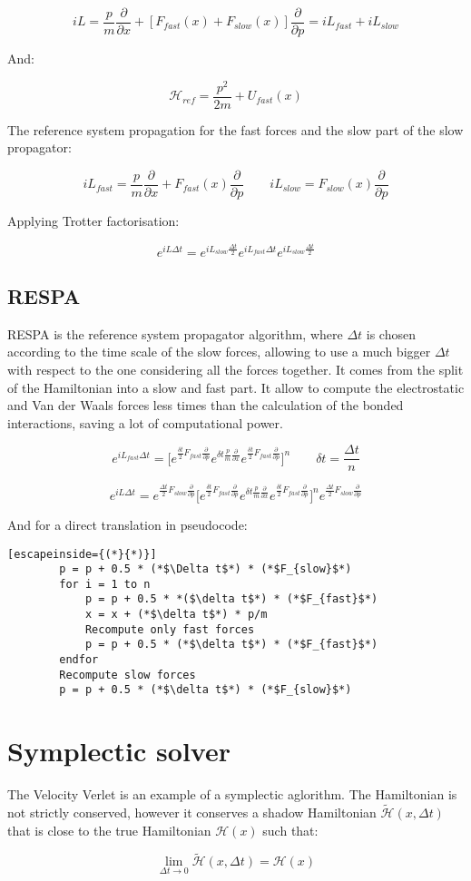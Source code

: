 	$$iL = \frac{p}{m}\frac{\partial }{\partial x} + [F_{fast}(x) + F_{slow}(x)]\frac{\partial}{\partial p} = iL_{fast} + iL_{slow}$$

	And:

	$$\mathcal{H}_{ref} = \frac{p^2}{2m} + U_{fast}(x)$$

	The reference system propagation for the fast forces and the slow part of the slow propagator:

	$$iL_{fast} = \frac{p}{m}\frac{\partial}{\partial x} + F_{fast}(x)\frac{\partial}{\partial p}\qquad iL_{slow} = F_{slow}(x)\frac{\partial}{\partial p}$$

	Applying Trotter factorisation:

	$$e^{iL\Delta t} = e^{iL_{slow}\frac{\Delta t}{2}}e^{iL_{fast}\Delta t}e^{iL_{slow}\frac{\Delta t}{2}}$$

	\subsection{RESPA}
	RESPA is the reference system propagator algorithm, where $\Delta t$ is chosen according to the time scale of the slow forces, allowing to use a much bigger $\Delta t$ with respect to the one considering all the forces together.
	It comes from the split of the Hamiltonian into a slow and fast part.
	It allow to compute the electrostatic and Van der Waals forces less times than the calculation of the bonded interactions, saving a lot of computational power.

	$$e^{iL_{fast}\Delta t} = \biggl[e^{\frac{\delta t}{2}F_{fast}\frac{\partial}{\partial p}}e^{\delta t\frac{p}{m}\frac{\partial}{\partial x}}e^{\frac{\delta t}{2}F_{fast}\frac{\partial}{\partial p}}\biggr]^n\qquad \delta t = \frac{\Delta t}{n}$$

	$$e^{iL\Delta t} = e^{\frac{\Delta t}{2}F_{slow}\frac{\partial}{\partial p}}\biggl[e^{\frac{\delta t}{2}F_{fast}\frac{\partial}{\partial p}}e^{\delta t\frac{p}{m}\frac{\partial}{\partial x}}e^{\frac{\delta t}{2}F_{fast}\frac{\partial}{\partial p}}\biggr]^ne^{\frac{\Delta t}{2}F_{slow}\frac{\partial}{\partial p}}$$

	And for a direct translation in pseudocode:

	\begin{lstlisting}[escapeinside={(*}{*)}]
		p = p + 0.5 * (*$\Delta t$*) * (*$F_{slow}$*)
		for i = 1 to n
			p = p + 0.5 * *($\delta t$*) * (*$F_{fast}$*)
			x = x + (*$\delta t$*) * p/m
			Recompute only fast forces
			p = p + 0.5 * (*$\delta t$*) * (*$F_{fast}$*)
		endfor
		Recompute slow forces
		p = p + 0.5 * (*$\delta t$*) * (*$F_{slow}$*)
	\end{lstlisting}

\section{Symplectic solver}
The Velocity Verlet is an example of a symplectic aglorithm.
The Hamiltonian is not strictly conserved, however it conserves a shadow Hamiltonian $\tilde{\mathcal{H}}(x, \Delta t)$ that is close to the true Hamiltonian $\mathcal{H}(x)$ such that:

$$\lim\limits_{\Delta t\rightarrow 0}\tilde{\mathcal{H}}(x, \Delta t) = \mathcal{H}(x)$$
